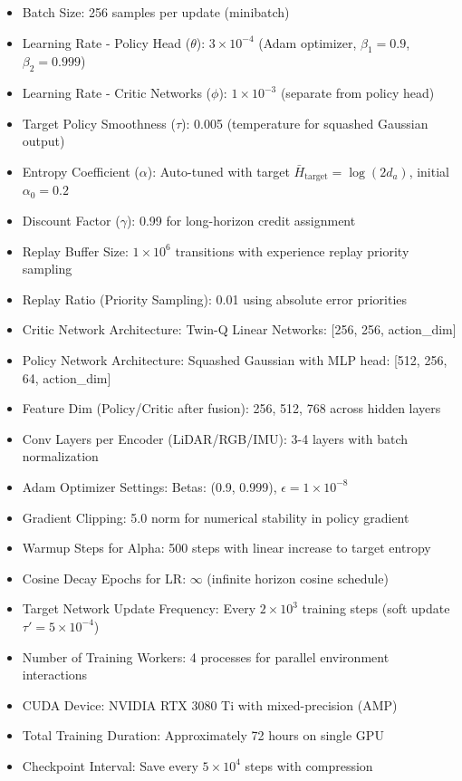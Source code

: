 \documentclass[10pt,twocolumn,letterpaper]{article}
\begin{document}
\begin{itemize}
    \item Batch Size: 256 samples per update (minibatch)
    \item Learning Rate - Policy Head ($\theta$): $3\times10^{-4}$ (Adam optimizer, $\beta_1=0.9$, $\beta_2=0.999$)
    \item Learning Rate - Critic Networks ($\phi$): $1\times10^{-3}$ (separate from policy head)
    \item Target Policy Smoothness ($\tau$): 0.005 (temperature for squashed Gaussian output)
    \item Entropy Coefficient ($\alpha$): Auto-tuned with target $\bar{H}_\text{target} = \log(2d_a)$, initial $\alpha_0=0.2$
    \item Discount Factor ($\gamma$): 0.99 for long-horizon credit assignment
    \item Replay Buffer Size: $1\times10^6$ transitions with experience replay priority sampling
    \item Replay Ratio (Priority Sampling): 0.01 using absolute error priorities
    \item Critic Network Architecture: Twin-Q Linear Networks: [256, 256, action_dim]
    \item Policy Network Architecture: Squashed Gaussian with MLP head: [512, 256, 64, action_dim]
    \item Feature Dim (Policy/Critic after fusion): 256, 512, 768 across hidden layers
    \item Conv Layers per Encoder (LiDAR/RGB/IMU): 3-4 layers with batch normalization
    \item Adam Optimizer Settings: Betas: (0.9, 0.999), $\epsilon=1\times10^{-8}$
    \item Gradient Clipping: 5.0 norm for numerical stability in policy gradient
    \item Warmup Steps for Alpha: 500 steps with linear increase to target entropy
    \item Cosine Decay Epochs for LR: $\infty$ (infinite horizon cosine schedule)
    \item Target Network Update Frequency: Every $2\times10^3$ training steps (soft update $\tau'=5\times10^{-4}$)
    \item Number of Training Workers: 4 processes for parallel environment interactions
    \item CUDA Device: NVIDIA RTX 3080 Ti with mixed-precision (AMP)
    \item Total Training Duration: Approximately 72 hours on single GPU
    \item Checkpoint Interval: Save every $5\times10^4$ steps with compression
\end{itemize}
\end{document}
